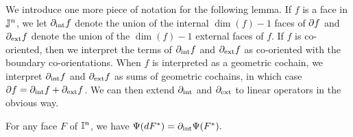 We introduce one more piece of notation for the following lemma.
If $f$ is a face in $\mathbb{J}^n$, we let $\partial_{\text{int}}f$ denote the union of the internal $\dim(f)-1$ faces of $\partial f$ and $\partial_{\text{ext}}f$ denote the union of the $\dim(f)-1$ external faces of $f$.
If $f$ is co-oriented, then we interpret the terms of $\partial_{\text{int}}f$ and $\partial_{\text{ext}}f$ as co-oriented with the boundary co-orientations.
When $f$ is interpreted as a geometric cochain, we interpret $\partial_{\text{int}}f$ and $\partial_{\text{ext}}f$ as sums of geometric cochains, in which case $\partial f = \partial_{\text{int}}f + \partial_{\text{ext}}f$.
We can then extend $\partial_{\text{int}}$ and $\partial_{\text{ext}}$ to linear operators in the obvious way.

\begin{lemma}\label{L: dualizing bijection}
	For any face $F$ of $\mathbb{I}^n$, we have $\Psi(d F^*) = \partial_{\text{int}}\Psi(F^*).$
\end{lemma}

